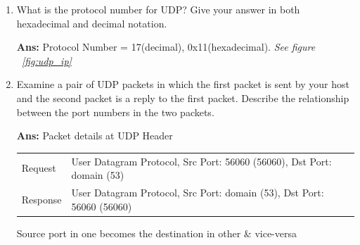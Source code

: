 \documentclass[a4,11pt]{article}
\newenvironment{que}
{ \color{ForestGreen}
  \begin{question}
}
{ \end{question} }
\newenvironment{sol}
{ \color{Black}
  \begin{solution}
}
{ \end{solution} }
\begin{document}
\begin{enumerate}
   
  \item
  \begin{que}
   What is the protocol number for UDP? Give your answer in both hexadecimal and decimal notation. 
  \end{que}

  \begin{sol}
   \textbf{Ans:}  Protocol Number =  17(decimal), 0x11(hexadecimal). \textit{ See figure ~\ref{fig:udp_ip}}
  \end{sol}

  
  \item
  \begin{que}
   Examine a pair of UDP packets in which the first packet is sent by your host and the second packet is a reply to the first packet. 
   Describe the relationship between the port numbers in the two packets.
  \end{que}

  \begin{sol}
  \textbf{Ans:} Packet details at UDP Header \\
   \begin{tabular}{|l|l|}
   \hline
      Request&	  User Datagram Protocol, Src Port: 56060 (56060), Dst Port: domain (53)\\
      Response&	  User Datagram Protocol, Src Port: domain (53), Dst Port: 56060 (56060) \\
      \hline
   \end{tabular}
   
  Source port in one becomes the destination in other \& vice-versa       
  \end{sol}

  \end{enumerate} 
  
\end{document}
